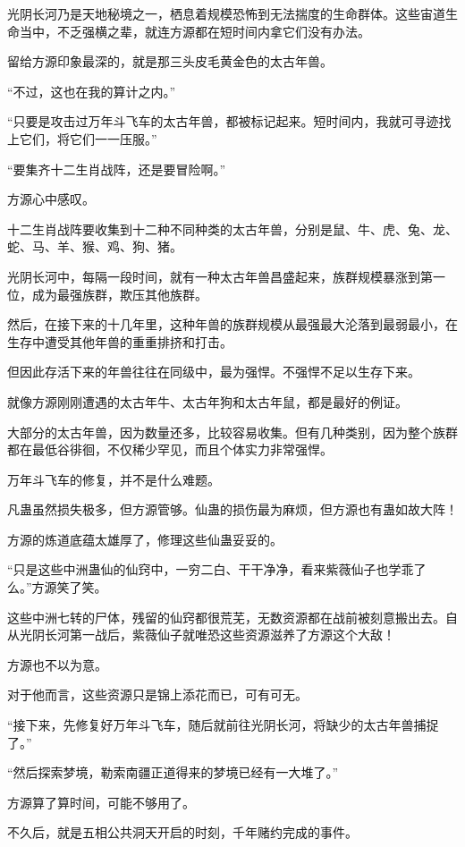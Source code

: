 \begin{this_body}
光阴长河乃是天地秘境之一，栖息着规模恐怖到无法揣度的生命群体。这些宙道生命当中，不乏强横之辈，就连方源都在短时间内拿它们没有办法。

留给方源印象最深的，就是那三头皮毛黄金色的太古年兽。

“不过，这也在我的算计之内。”

“只要是攻击过万年斗飞车的太古年兽，都被标记起来。短时间内，我就可寻迹找上它们，将它们一一压服。”

“要集齐十二生肖战阵，还是要冒险啊。”

方源心中感叹。

十二生肖战阵要收集到十二种不同种类的太古年兽，分别是鼠、牛、虎、兔、龙、蛇、马、羊、猴、鸡、狗、猪。

光阴长河中，每隔一段时间，就有一种太古年兽昌盛起来，族群规模暴涨到第一位，成为最强族群，欺压其他族群。

然后，在接下来的十几年里，这种年兽的族群规模从最强最大沦落到最弱最小，在生存中遭受其他年兽的重重排挤和打击。

但因此存活下来的年兽往往在同级中，最为强悍。不强悍不足以生存下来。

就像方源刚刚遭遇的太古年牛、太古年狗和太古年鼠，都是最好的例证。

大部分的太古年兽，因为数量还多，比较容易收集。但有几种类别，因为整个族群都在最低谷徘徊，不仅稀少罕见，而且个体实力非常强悍。

万年斗飞车的修复，并不是什么难题。

凡蛊虽然损失极多，但方源管够。仙蛊的损伤最为麻烦，但方源也有蛊如故大阵！

方源的炼道底蕴太雄厚了，修理这些仙蛊妥妥的。

“只是这些中洲蛊仙的仙窍中，一穷二白、干干净净，看来紫薇仙子也学乖了么。”方源笑了笑。

这些中洲七转的尸体，残留的仙窍都很荒芜，无数资源都在战前被刻意搬出去。自从光阴长河第一战后，紫薇仙子就唯恐这些资源滋养了方源这个大敌！

方源也不以为意。

对于他而言，这些资源只是锦上添花而已，可有可无。

“接下来，先修复好万年斗飞车，随后就前往光阴长河，将缺少的太古年兽捕捉了。”

“然后探索梦境，勒索南疆正道得来的梦境已经有一大堆了。”

方源算了算时间，可能不够用了。

不久后，就是五相公共洞天开启的时刻，千年赌约完成的事件。


\end{this_body}

